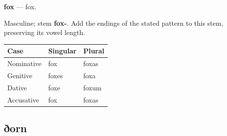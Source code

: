 \par\begin{minipage}{\linewidth}\raggedright
\textbf{fox} — fox.

Masculine; stem \textbf{fox-}. Add the endings of the stated pattern to this stem, preserving its vowel length.

\par\begingroup
\fontsize{10.5}{13.2}\selectfont
\setlength{\LTleft}{0pt}\setlength{\LTright}{\fill}
\noindent
\begin{tabular}{@{}>{\raggedright\arraybackslash}p{39.46mm}>{\raggedright\arraybackslash}p{39.46mm}>{\raggedright\arraybackslash}p{39.46mm}@{}}
\toprule
\textbf{Case} & \textbf{Singular} & \textbf{Plural} \\
\midrule
Nominative & fox & foxas \\
Genitive & foxes & foxa \\
Dative & foxe & foxum \\
Accusative & fox & foxas \\
\bottomrule
\end{tabular}
\par\endgroup

\end{minipage}\par
{}
\subsection*{ðorn}


